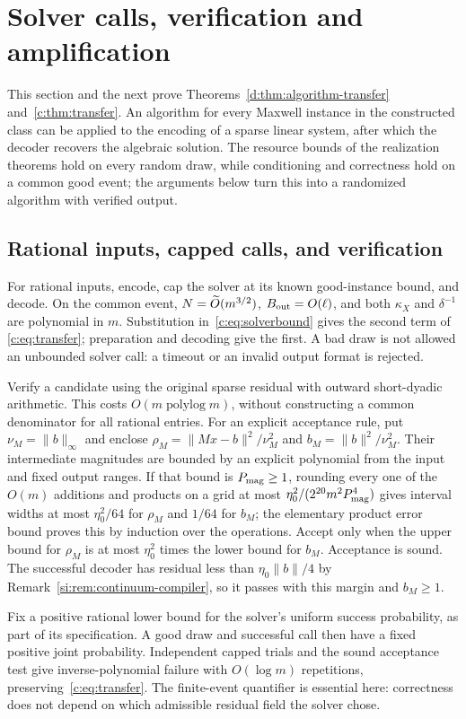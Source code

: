 \section{Solver calls, verification and amplification}\label{si:sec:transfer-proof}

This section and the next prove Theorems~\ref{d:thm:algorithm-transfer}
and~\ref{c:thm:transfer}. An algorithm for every Maxwell instance in
the constructed class can be applied to the encoding of a sparse linear system, after
which the decoder recovers the algebraic solution. The resource bounds of
the realization theorems hold on every random draw, while conditioning
and correctness hold on a common good event; the arguments below turn
this into a randomized algorithm with verified output.

\subsection{Rational inputs, capped calls, and verification}
For rational inputs, encode, cap the solver at its known good-instance
bound, and decode. On the common event, $N=\widetilde O(m^{3/2})$, $B_{\rm out}=O(\ell)$,
and both $\kappa_X$ and $\delta^{-1}$ are polynomial in $m$.
Substitution in~\eqref{c:eq:solverbound} gives the second term of
\eqref{c:eq:transfer}; preparation and decoding give the first.
A bad draw is not allowed an unbounded solver call: a timeout or an
invalid output format is rejected.

Verify a candidate using the original sparse residual with outward
short-dyadic arithmetic. This costs $O(m\operatorname{polylog}m)$,
without constructing a common denominator for all rational entries.
For an explicit acceptance rule, put $\nu_M=\|b\|_\infty$ and enclose
$\rho_M=\|Mx-b\|^2/\nu_M^2$ and $b_M=\|b\|^2/\nu_M^2$. Their intermediate
magnitudes are bounded by an explicit polynomial from the input and
fixed output ranges. If that bound is $P_{\rm mag}\ge1$, rounding every one
of the $O(m)$ additions and products on a grid at most
$\eta_0^2/(2^{20}m^2P_{\rm mag}^4)$ gives interval widths at most
$\eta_0^2/64$ for $\rho_M$ and $1/64$ for $b_M$; the elementary product
error bound proves this by induction over the operations. Accept
only when the upper bound for $\rho_M$ is at most $\eta_0^2$ times the
lower bound for $b_M$. Acceptance is sound. The successful decoder
has residual less than $\eta_0\|b\|/4$ by
Remark~\ref{si:rem:continuum-compiler}, so it passes with this margin and
$b_M\ge1$.

Fix a positive rational lower bound for the solver's uniform success
probability, as part of its specification. A good draw and successful
call then have a fixed positive joint probability. Independent capped
trials and the sound acceptance test give inverse-polynomial failure
with $O(\log m)$ repetitions, preserving~\eqref{c:eq:transfer}. The
finite-event quantifier is essential here: correctness does not depend
on which admissible residual field the solver chose.

